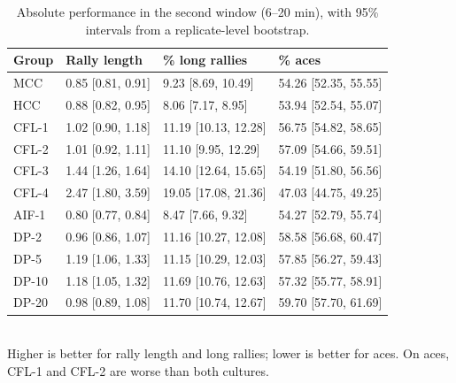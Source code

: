 \begin{table}[ht]
\centering
\small
\caption{Absolute performance in the second window (6--20 min), with 95\% intervals from a replicate-level bootstrap.}
\label{tab:absolute}
\begin{tabular}{llll}
\toprule
Group & Rally length & \% long rallies & \% aces \\
\midrule
MCC & 0.85 [0.81, 0.91] & 9.23 [8.69, 10.49] & 54.26 [52.35, 55.55] \\
HCC & 0.88 [0.82, 0.95] & 8.06 [7.17, 8.95] & 53.94 [52.54, 55.07] \\
CFL-1 & 1.02 [0.90, 1.18] & 11.19 [10.13, 12.28] & 56.75 [54.82, 58.65] \\
CFL-2 & 1.01 [0.92, 1.11] & 11.10 [9.95, 12.29] & 57.09 [54.66, 59.51] \\
CFL-3 & 1.44 [1.26, 1.64] & 14.10 [12.64, 15.65] & 54.19 [51.80, 56.56] \\
CFL-4 & 2.47 [1.80, 3.59] & 19.05 [17.08, 21.36] & 47.03 [44.75, 49.25] \\
AIF-1 & 0.80 [0.77, 0.84] & 8.47 [7.66, 9.32] & 54.27 [52.79, 55.74] \\
DP-2 & 0.96 [0.86, 1.07] & 11.16 [10.27, 12.08] & 58.58 [56.68, 60.47] \\
DP-5 & 1.19 [1.06, 1.33] & 11.15 [10.29, 12.03] & 57.85 [56.27, 59.43] \\
DP-10 & 1.18 [1.05, 1.32] & 11.69 [10.76, 12.63] & 57.32 [55.77, 58.91] \\
DP-20 & 0.98 [0.89, 1.08] & 11.70 [10.74, 12.67] & 59.70 [57.70, 61.69] \\
\bottomrule
\end{tabular}
\\[4pt]\footnotesize{Higher is better for rally length and long rallies; lower is better for aces. On aces, CFL-1 and CFL-2 are worse than both cultures.}
\end{table}
